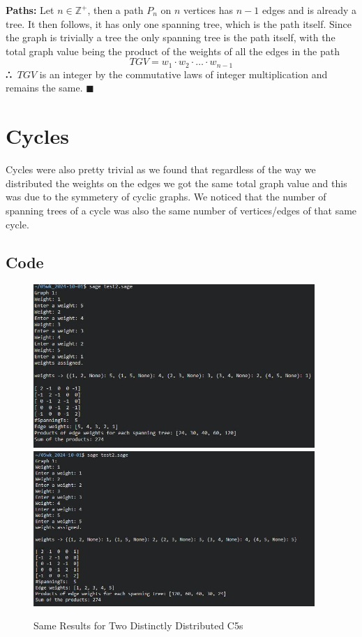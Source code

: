 \documentclass[12pt,letterpaper]{article}
\def\therefore{\boldsymbol{\text{ }
\leavevmode
\lower0.4ex\hbox{$\cdot$}
\kern-.5em\raise0.7ex\hbox{$\cdot$}
\kern-0.55em\lower0.4ex\hbox{$\cdot$}
\thinspace\text{ }}}
\begin{document}
\textbf{Paths:}
Let $n\in\mathbb{Z}^{+}$, then a path $P_{n}$ on $n$ vertices has $n-1$ edges and is already a tree. It then follows, it has only one spanning tree, which is the path itself. Since the graph is trivially a tree the only spanning tree is the path itself, with the total graph value being the product of the weights of all the edges in the path $$TGV=w_{1}\cdot w_{2}\cdot\ldots\cdot w_{n-1}$$
$\therefore$ $TGV$ is an integer by the commutative laws of integer multiplication and remains the same. $\blacksquare$\\

\section{Cycles} \label{C}
Cycles were also pretty trivial as we found that regardless of the way we distributed the weights on the edges we got the same total graph value and this was due to the symmetery of cyclic graphs. We noticed that the number of spanning trees of a cycle was also the same number of vertices/edges of that same cycle.

\subsection{Code}
 
	\begin{figure}[h!]
  \begin{center}
    \includegraphics[width=4.2in]{f2.1.jpg}
    \includegraphics[width=4.2in]{f2.11.jpg}
    \caption{\label{Patch} Same Results for Two Distinctly Distributed C5s}
  \end{center}
	\end{figure}
  
\end{document}
